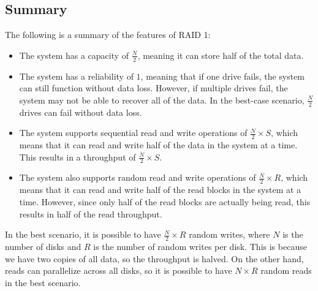 \subsection{Summary}
The following is a summary of the features of RAID 1:
\begin{itemize}
    \item The system has a capacity of $\frac{N}{2}$, meaning it can store half of the total data.
    \item The system has a reliability of $1$, meaning that if one drive fails, the system can still function without data loss.
        However, if multiple drives fail, the system may not be able to recover all of the data. 
        In the best-case scenario, $\frac{N}{2}$ drives can fail without data loss.
    \item The system supports sequential read and write operations of $\frac{N}{2}\times S$, which means that it can read and write half of the data in the system at a time.
        This results in a throughput of $\frac{N}{2}\times S$.
    \item The system also supports random read and write operations of $\frac{N}{2}\times R$, which means that it can read and write half of the read blocks in the system at a time. 
        However, since only half of the read blocks are actually being read, this results in half of the read throughput.
\end{itemize}
In the best scenario, it is possible to have $\frac{N}{2} \times R$ random writes, where $N$ is the number of disks and $R$ is the number of random writes per disk. 
This is because we have two copies of all data, so the throughput is halved. 
On the other hand, reads can parallelize across all disks, so it is possible to have $N \times R$ random reads in the best scenario.